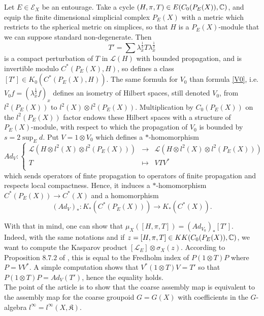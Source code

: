 Let $E\in \mathcal E_X$ be an entourage. Take a cycle $(H,\pi, T)\in E(C_0(P_E(X)), \mathbb C)$, and equip the finite dimensional simplicial complex $P_E(X)$ with a metric which restricts to the spherical metric on simplices, so that $H$ is a $P_E(X)$-module that we can suppose standard non-degenerate. Then 
\[T'=\sum \lambda_x^{\frac{1}{2}} T \lambda_x^{\frac{1}{2}} \] 
is a compact perturbation of $T$ in $\mathcal L(H)$ with bounded propagation, and is invertible modulo $C^*(P_E(X),H)$, so defines a class $[T']\in K_0(C^*(P_E(X),H))$. 
The same formula for $V_0$ than formula \ref{V0}, i.e. $V_0f = (\lambda_x^{\frac{1}{2}}f)_{x}$ defines an isometry of Hilbert spaces, still denoted $V_0$, from $l^2(P_E(X))$ to $l^2(X)\otimes l^2(P_E(X))$. Multiplication by $C_0(P_E(X))$ on the $l^2(P_E(X))$ factor endows these Hilbert spaces with a structure of $P_E(X)$-module, with respect to which the propagation of $V_0$ is bounded by $s = 2\sup_E d$. Put $V = 1\otimes V_0 $ which defines a $*$-homomorphism
\[Ad_{V} :\left\{\begin{array}{rcl} 
\mathcal L(H\otimes l^2(X)\otimes l^2(P_E(X)) ) & \rightarrow & \mathcal L(H\otimes l^2(X)\otimes l^2(P_E(X)) ) \\
T &\mapsto & VTV^* \\
\end{array}\right.\]
which sends operators of finte propagation to operators of finite propagation and respects local compactness. Hence, it induces a $*$-homomorphism $C^*(P_E(X))\rightarrow C^*(X)$ and a homomorphism
\[(Ad_{V})_* : K_*(C^*(P_E(X)))\rightarrow K_*(C^*(X)).\]

With that in mind, one can show that $\mu_{X}([H,\pi,T])=(Ad_{V_0})_*[T']$.\\

Indeed, with the same notations and if $z=[H,\pi,T]\in KK(C_0(P_E(X)),\mathbb C)$, we want to compute the Kasparov product $[\mathcal L_E]\otimes \sigma_X(z)$. According to Proposition $8.7.2$ of \cite{HigsonRoe}, this is equal to the Fredholm index of $P(1\otimes T)P$ where $P=VV^*$. A simple computation shows that $V^*(1\otimes T)V=T'$ so that $P(1\otimes T)P = Ad_V(T')$, hence the equality holds.\\

The point of the article \cite{SkTuYu} is to show that the coarse assembly map is equivalent to the assembly map for the coarse groupoid $G=G(X)$ with coefficients in the $G$-algebra $l^\infty=l^\infty(X,\mathfrak K)$. \\

